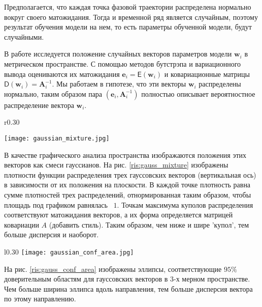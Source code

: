 \documentclass[12pt, twoside]{article}
\begin{document}
Предполагается, что каждая точка фазовой траектории распределена нормально вокруг своего матожидания. Тогда и временной ряд является случайным, поэтому результат обучения модели на нем, то есть параметры обученной модели, будут случайными.


В работе исследуется положение случайных векторов параметров модели $\mathbf{w}_i$ в метрическом пространстве. С помощью методов бутстрэпа и вариационного вывода \citep{hastie2009elements} оцениваются их матожидания $\mathbf{e}_i=\mathsf{E}(\mathbf{w}_i)$ и ковариационные матрицы $\mathsf{D}(\mathbf{w}_i) = \mathbf{A}^{-1}_i$. Мы работаем в гипотезе, что эти векторы $\mathbf{w}_i$ распределены нормально, таким образом пара $(\mathbf{e}_i, \mathbf{A}^{-1}_i)$ полностью описывает вероятностное распределение вектора $\mathbf{w}_i$.

\begin{wrapfigure}{r}{0.30\textwidth}

\texttt{[image: gaussian\_mixture.jpg]}
\caption{Смесь гауссианов трех 2-х мерных векторов.}
\label{ris:gauss_mixture}
\end{wrapfigure}


В качестве графического анализа пространства изображаются положения этих векторов как смеси гауссианов. На рис. \ref{ris:gauss_mixture} изображены плотности функции распределения трех гауссовских векторов (вертикальная ось) в зависимости от их положения на плоскости. В каждой точке плотность равна сумме плотностей трех распределений, отнормированная таким образом, чтобы площадь под графиком равнялась ~$1$. Точкам максимума куполов распределения соответствуют матожидания векторов, а их форма определяется матрицей ковариации $A$ (добавить стиль). Таким образом, чем ниже и шире 'купол', тем больше дисперсия и наоборот.

\begin{wrapfigure}{l}{0.30\textwidth}
\texttt{[image: gaussian\_conf\_area.jpg]}
\caption{Доверительные области 3-х мерных векторов.}
\label{ris:gauss_conf_area}
\end{wrapfigure}


На рис. \ref{ris:gauss_conf_area} изображены эллипсы, соответствующие $95\%$ доверительным областям для гауссовских векторов в 3-х мерном пространстве. Чем больше ширина эллипса вдоль направления, тем больше дисперсия вектора по этому направлению.
\end{document}
